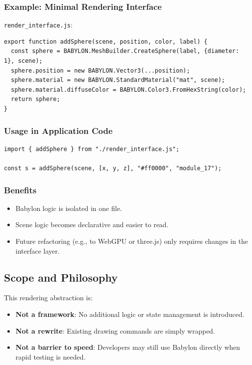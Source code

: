 \documentclass{article}
\begin{document}
\subsubsection*{Example: Minimal Rendering Interface}

\texttt{render\_interface.js}:
\begin{verbatim}
export function addSphere(scene, position, color, label) {
  const sphere = BABYLON.MeshBuilder.CreateSphere(label, {diameter: 1}, scene);
  sphere.position = new BABYLON.Vector3(...position);
  sphere.material = new BABYLON.StandardMaterial("mat", scene);
  sphere.material.diffuseColor = BABYLON.Color3.FromHexString(color);
  return sphere;
}
\end{verbatim}

\subsubsection*{Usage in Application Code}

\begin{verbatim}
import { addSphere } from "./render_interface.js";

const s = addSphere(scene, [x, y, z], "#ff0000", "module_17");
\end{verbatim}

\subsubsection*{Benefits}

\begin{itemize}
  \item Babylon logic is isolated in one file.
  \item Scene logic becomes declarative and easier to read.
  \item Future refactoring (e.g., to WebGPU or three.js) only requires changes in the interface layer.
\end{itemize}

\subsection{Scope and Philosophy}

This rendering abstraction is:
\begin{itemize}
  \item \textbf{Not a framework}: No additional logic or state management is introduced.
  \item \textbf{Not a rewrite}: Existing drawing commands are simply wrapped.
  \item \textbf{Not a barrier to speed}: Developers may still use Babylon directly when rapid testing is needed.
\end{itemize}
\end{document}
